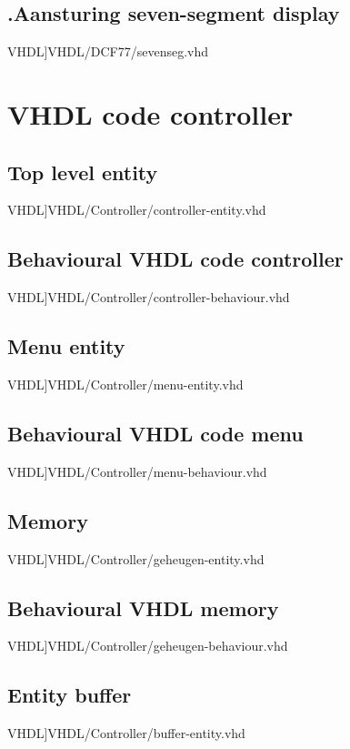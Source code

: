 \subsection*{\label{code: fpga_sevenseg}\thesubsection.\quad Aansturing seven-segment display}
\scriptsize 
 VHDL]{VHDL/DCF77/sevenseg.vhd}
\normalsize
\newpage


\section{VHDL code controller}
\label{Ap:code_controller}
\subsection{Top level entity}
\scriptsize 
 VHDL]{VHDL/Controller/controller-entity.vhd}
\normalsize
\label{code:controller_ent}
\subsection{Behavioural VHDL code controller}
\scriptsize 
 VHDL]{VHDL/Controller/controller-behaviour.vhd}
\normalsize
\label{code:controller_beh}
\subsection{Menu entity}
\scriptsize 
 VHDL]{VHDL/Controller/menu-entity.vhd}
\normalsize
\label{code:menu_ent}
\subsection{Behavioural VHDL code menu}
\scriptsize 
 VHDL]{VHDL/Controller/menu-behaviour.vhd}
\normalsize
\label{code:menu_beh}
\subsection{Memory}
\scriptsize 
 VHDL]{VHDL/Controller/geheugen-entity.vhd}
\normalsize
\label{code:geheugen_ent}
\subsection{Behavioural VHDL memory}
\scriptsize 
 VHDL]{VHDL/Controller/geheugen-behaviour.vhd}
\normalsize
\label{code:geheugen_beh}
\subsection{Entity buffer}
\scriptsize 
 VHDL]{VHDL/Controller/buffer-entity.vhd}
\normalsize
\label{code:buffer_ent}
